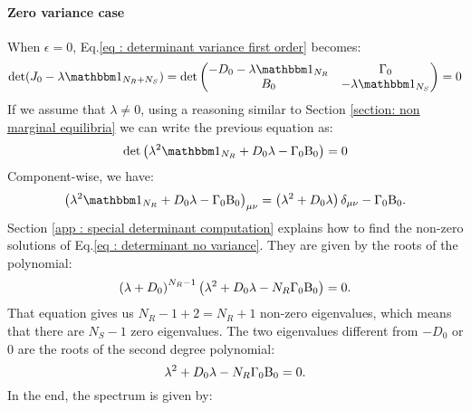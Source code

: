 \documentclass[12pt, titlepage, twoside, openright]{report}
\begin{document}
  \paragraph{Zero variance case}\label{sec : methods dynamical stability fully connected zero variance}
  When $\epsilon=0$, Eq.\eqref{eq : determinant variance first order} becomes:
  \begin{equation}
  \det(J_0-\lambda \identity{N_R+N_S})=\det\begin{pmatrix}
  -D_0-\lambda \identity{N_R} & \Gamma_0 \\
  B_0 & -\lambda \identity{N_S}
  \end{pmatrix}
  =
  0
  \end{equation}
  If we assume that $\lambda\neq 0$, using a reasoning similar to Section \ref{section: non marginal equilibria} we can write the previous equation as:
  \begin{equation}
  \det\left(\lambda^2 \identity{N_R}+D_0 \lambda - \Gamma_0 \Beta_0 \right)=0 \label{eq : determinant no variance}
  \end{equation}
  Component-wise, we have:
  \begin{equation}
  \left(\lambda^2 \identity{N_R}+D_0 \lambda - \Gamma_0 \Beta_0 \right)_{\mu\nu} = \left(\lambda^2+D_0 \lambda\right)\delta_{\mu \nu} - \Gamma_0\Beta_0.
  \end{equation}
  Section \ref{app : special determinant computation} explains how to find the non-zero solutions of Eq.\eqref{eq : determinant no variance}. They are given by the roots of the polynomial:
  \begin{equation}
  \left(\lambda+D_0\right)^{N_R-1}\left(\lambda^2+D_0 \lambda -N_R \Gamma_0 \text{B}_0\right)=0.
  \end{equation}
  That equation gives us $N_R-1+2=N_R+1$ non-zero eigenvalues, which means that there are $N_S-1$ zero eigenvalues. The two eigenvalues different from $-D_0$ or $0$ are the roots of the second degree polynomial:
  \begin{equation}
  \lambda^2 + D_0 \lambda- N_R \Gamma_0 \text{B}_0 =0.
  \end{equation}
  In the end, the spectrum is given by:
\end{document}
